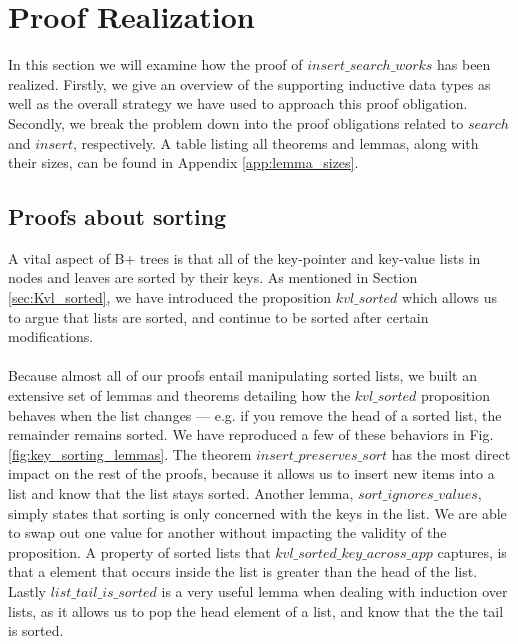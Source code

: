 \section{Proof Realization}
\label{sec:ProofRealization}
In this section we will examine how the proof of $insert\_search\_works$ has been realized. Firstly, we give an overview of the supporting inductive data types as well as the overall strategy we have used to approach this proof obligation. Secondly, we break the problem down into the proof obligations related to $search$ and $insert$, respectively. A table listing all theorems and lemmas, along with their sizes, can be found in Appendix \ref{app:lemma_sizes}.

\subsection{Proofs about sorting}
A vital aspect of B+ trees is that all of the key-pointer and key-value lists in nodes and leaves are sorted by their keys. As mentioned in Section \ref{sec:Kvl_sorted}, we have introduced the proposition $kvl\_sorted$ which allows us to argue that lists are sorted, and continue to be sorted after certain modifications.

\paragraph{}
Because almost all of our proofs entail manipulating sorted lists, we built an extensive set of lemmas and theorems detailing how the $kvl\_sorted$ proposition behaves when the list changes --- e.g. if you remove the head of a sorted list, the remainder remains sorted. We have reproduced a few of these behaviors in Fig. \ref{fig:key_sorting_lemmas}. The theorem $insert\_preserves\_sort$ has the most direct impact on the rest of the proofs, because it allows us to insert new items into a list and know that the list stays sorted. Another lemma, $sort\_ignores\_values$, simply states that sorting is only concerned with the keys in the list. We are able to swap out one value for another without impacting the validity of the proposition. A property of sorted lists that $kvl\_sorted\_key\_across\_app$ captures, is that a element that occurs inside the list is greater than the head of the list. Lastly $list\_tail\_is\_sorted$ is a very useful lemma when dealing with induction over lists, as it allows us to pop the head element of a list, and know that the the tail is sorted.

